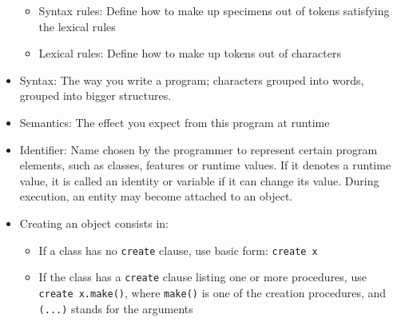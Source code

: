 \documentclass[a4paper]{article}
\newcommand{\inline}[1]{\lstinline!#1!}%
\begin{document}
\begin{itemize}
\begin{itemize}
\item Syntax rules: Define how to make up specimens out of tokens satisfying the lexical rules
\item Lexical rules: Define how to make up tokens out of characters
\end{itemize}
\item Syntax: The way you write a program; characters grouped into words, grouped into bigger structures. 
\item Semantics: The effect you expect from this program at runtime
\item Identifier: Name chosen by the programmer to represent certain program elements, such as classes, features or runtime values. If it denotes a runtime value, it is called an identity or variable if it can change its value. During execution, an entity may become attached to an object. 
\item Creating an object consists in:
\begin{itemize}
\item If a class has no \inline{create} clause, use basic form: \inline{create x}
\item If the class has a \inline{create} clause listing one or more procedures, use \inline{create x.make()}, where \inline{make()} is one of the creation procedures, and \inline{(...)} stands for the arguments
\end{itemize}
\end{itemize}
\end{document}
